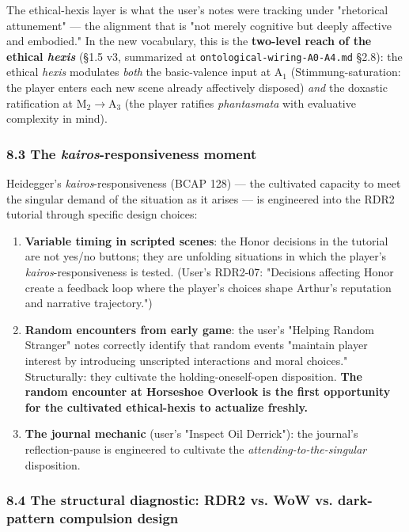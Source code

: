 \documentclass[11pt]{report}
\begin{document}
The ethical-hexis layer is what the user's notes were tracking under "rhetorical attunement" — the alignment that is "not merely cognitive but deeply affective and embodied." In the new vocabulary, this is the \textbf{two-level reach of the ethical \textit{hexis}} (§1.5 v3, summarized at \texttt{ontological-\discretionary{}{}{}wiring-\discretionary{}{}{}A0-\discretionary{}{}{}A4.\discretionary{}{}{}md} §2.8): the ethical \textit{hexis} modulates \textit{both} the basic-valence input at A$_1$ (Stimmung-saturation: the player enters each new scene already affectively disposed) \textit{and} the doxastic ratification at M$_2$$\rightarrow$\allowbreak A$_3$ (the player ratifies \textit{phantasmata} with evaluative complexity in mind).


\subsubsection{8.3 The \textit{kairos}-responsiveness moment}


Heidegger's \textit{kairos}-responsiveness (BCAP 128) — the cultivated capacity to meet the singular demand of the situation as it arises — is engineered into the RDR2 tutorial through specific design choices:


\begin{enumerate}
\item \textbf{Variable timing in scripted scenes}: the Honor decisions in the tutorial are not yes/no buttons; they are unfolding situations in which the player's \textit{kairos}-responsiveness is tested. (User's RDR2-07: "Decisions affecting Honor create a feedback loop where the player's choices shape Arthur's reputation and narrative trajectory.")
\item \textbf{Random encounters from early game}: the user's "Helping Random Stranger" notes correctly identify that random events "maintain player interest by introducing unscripted interactions and moral choices." Structurally: they cultivate the holding-oneself-open disposition. \textbf{The random encounter at Horseshoe Overlook is the first opportunity for the cultivated ethical-hexis to actualize freshly.}
\item \textbf{The journal mechanic} (user's "Inspect Oil Derrick"): the journal's reflection-pause is engineered to cultivate the \textit{attending-to-the-singular} disposition.
\end{enumerate}


\subsubsection{8.4 The structural diagnostic: RDR2 vs. WoW vs. dark-pattern compulsion design}
\end{document}

